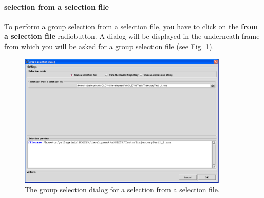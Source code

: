 \documentclass[a4paper,11pt]{report}
\begin{document}
\paragraph{selection from a selection file\\}
\label{group_selection_from_a_selection_file}
To perform a group selection from a selection file, you have to click on the \textbf{from a selection file} radiobutton. 
A dialog will be displayed in the underneath frame from which you will be asked for a group selection file 
(see Fig. \ref{fig:group_selection_from_a_selection_file}).
\begin{figure}[h!]
\begin{center}
\includegraphics[width=10cm]{Figures/group_selection_from_a_selection_file.eps}
\end{center}
\caption[The group selection dialog for a selection from a selection file]{The group selection dialog for a selection from a selection file.}
\label{fig:group_selection_from_a_selection_file}
\end{figure}   
\end{document}
